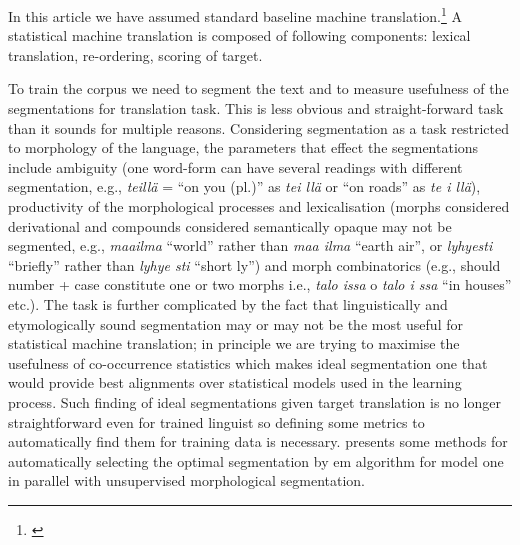\documentclass[11pt,letterpaper]{article}
\begin{document}
In this article we have assumed standard baseline machine 
translation.\footnote{\url{}} 
A statistical machine translation is composed of following components:
lexical translation, re-ordering, scoring of target.

To train the corpus we need to segment the text and to measure usefulness of
the segmentations for translation task. This is less obvious and
straight-forward task than it sounds for multiple reasons. Considering
segmentation as a task restricted to morphology of the language, the parameters
that effect the segmentations include ambiguity (one word-form can have several
readings with different segmentation, e.g., \emph{teillä} = ``on you (pl.)'' as
\emph{tei llä} or ``on roads'' as \emph{te i llä}), productivity of the
morphological processes and lexicalisation (morphs considered derivational and
compounds considered semantically opaque may not be segmented, e.g.,
\emph{maailma} ``world'' rather than \emph{maa ilma} ``earth air'', or
\emph{lyhyesti} ``briefly'' rather than \emph{lyhye sti} ``short ly'') and
morph combinatorics (e.g., should number + case constitute one or two morphs
i.e., \emph{talo issa} o \emph{talo i ssa} ``in houses'' etc.).  The task is
further complicated by the fact that linguistically and etymologically sound
segmentation may or may not be the most useful for statistical machine
translation; in principle we are trying to maximise the usefulness of
co-occurrence statistics which makes ideal segmentation one that would provide
best alignments over statistical models used in the learning process. Such
finding of ideal segmentations given target translation is no longer
straightforward even for trained linguist so defining some metrics to
automatically find them for training data is necessary.
\cite{mermer2010unsupervised} presents some methods for automatically selecting
the optimal segmentation by em algorithm for model one in parallel with
unsupervised morphological segmentation. 
\end{document}
